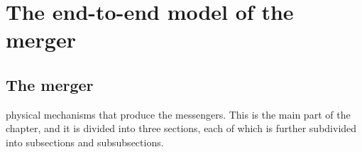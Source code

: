 

\chapter{The end-to-end model of the merger}

\section{The merger}



physical mechanisms that produce the messengers. This is the main part of the chapter, and it is divided into three sections, each of which is further subdivided into subsections and subsubsections.




